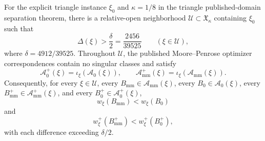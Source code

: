 For the explicit triangle instance \(\xi_0\) and \(\kappa=1/8\) in the triangle published-domain separation theorem, there is a relative-open neighborhood \(\mathcal U\subset\mathfrak X_\kappa\) containing \(\xi_0\) such that
\[
\Delta(\xi)>\frac{\delta}{2}=\frac{2456}{39525}
\qquad(\xi\in\mathcal U),
\]
where \(\delta=4912/39525\).  Throughout \(\mathcal U\), the published Moore--Penrose optimizer correspondences contain no singular classes and satisfy
\[
\mathcal A_0^+(\xi)=\iota_\xi\!\left(\mathcal A_0(\xi)\right),
\qquad
\mathcal A_{\mathrm{mm}}^+(\xi)
=\iota_\xi\!\left(\mathcal A_{\mathrm{mm}}(\xi)\right).
\]
Consequently, for every \(\xi\in\mathcal U\), every \(B_{\mathrm{mm}}\in\mathcal A_{\mathrm{mm}}(\xi)\), every \(B_0\in\mathcal A_0(\xi)\), every \(B_{\mathrm{mm}}^+\in\mathcal A_{\mathrm{mm}}^+(\xi)\), and every \(B_0^+\in\mathcal A_0^+(\xi)\),
\[
w_\xi(B_{\mathrm{mm}})<w_\xi(B_0)
\]
and
\[
w_\xi^+(B_{\mathrm{mm}}^+)<w_\xi^+(B_0^+),
\]
with each difference exceeding \(\delta/2\).